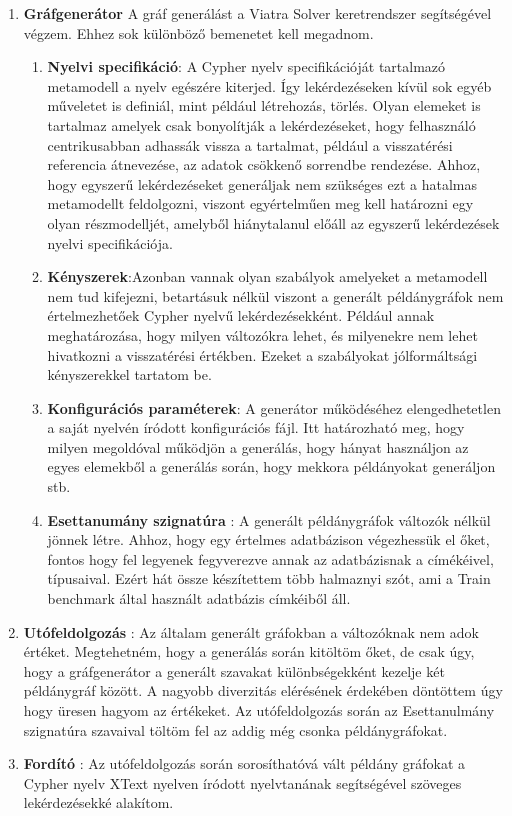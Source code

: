 \begin{enumerate}
	\item \textbf{Gráfgenerátor}
	A gráf generálást a Viatra Solver keretrendszer  segítségével végzem. Ehhez sok különböző bemenetet kell megadnom. 
	\begin{enumerate}
		\item\textbf{Nyelvi specifikáció}: A Cypher nyelv specifikációját tartalmazó metamodell a nyelv egészére kiterjed. Így lekérdezéseken kívül sok egyéb műveletet is definiál, mint például létrehozás, törlés. Olyan elemeket is tartalmaz amelyek csak bonyolítják a lekérdezéseket, hogy felhasználó centrikusabban adhassák vissza a tartalmat, például a visszatérési referencia átnevezése, az adatok csökkenő sorrendbe rendezése. Ahhoz, hogy egyszerű lekérdezéseket generáljak nem szükséges ezt a hatalmas metamodellt feldolgozni, viszont egyértelműen meg kell határozni egy olyan részmodelljét, amelyből hiánytalanul előáll az egyszerű lekérdezések nyelvi specifikációja. 
		\item\textbf{Kényszerek}:Azonban vannak	olyan szabályok amelyeket a metamodell nem tud kifejezni, betartásuk nélkül viszont a generált példánygráfok nem értelmezhetőek Cypher nyelvű lekérdezésekként. Például annak meghatározása, hogy milyen változókra lehet, és milyenekre nem lehet hivatkozni a visszatérési értékben. Ezeket a szabályokat jólformáltsági kényszerekkel tartatom be. 
		\item\textbf{Konfigurációs paraméterek}: A generátor működéséhez elengedhetetlen a saját nyelvén íródott konfigurációs fájl. Itt határozható meg, hogy milyen megoldóval működjön a generálás, hogy hányat használjon az egyes elemekből a generálás során, hogy mekkora példányokat generáljon stb.  
		\item\textbf{Esettanumány szignatúra} : A generált példánygráfok változók nélkül jönnek létre. Ahhoz, hogy egy értelmes adatbázison végezhessük el őket, fontos hogy fel legyenek fegyverezve annak az adatbázisnak a címékéivel, típusaival. Ezért hát  össze készítettem több halmaznyi szót, ami a Train benchmark által használt adatbázis címkéiből áll. 
	\end{enumerate}
	\item \textbf{Utófeldolgozás} : Az általam generált gráfokban a változóknak nem adok értéket. Megtehetném, hogy a generálás során kitöltöm őket, de csak úgy, hogy a gráfgenerátor a generált szavakat különbségekként kezelje két példánygráf között. A nagyobb diverzitás elérésének érdekében döntöttem úgy hogy üresen hagyom az értékeket.  Az utófeldolgozás során az Esettanulmány szignatúra szavaival töltöm fel az addig még csonka példánygráfokat.    
	\item \textbf{Fordító} : Az utófeldolgozás során sorosíthatóvá vált példány gráfokat a Cypher nyelv XText nyelven íródott nyelvtanának segítségével szöveges lekérdezésekké alakítom.  
\end{enumerate}



